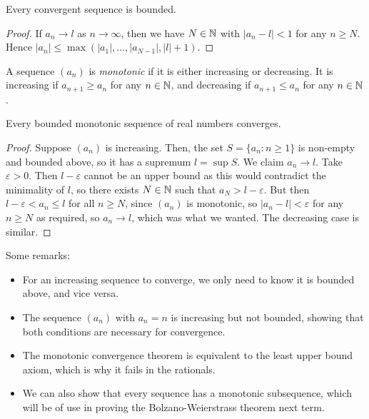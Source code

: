 \documentclass{../template/note}
\begin{document}
    \begin{proposition}
        Every convergent sequence is bounded.
    \end{proposition}
    
    \begin{proof}
        If \(a_n \to l\) as \(n \to \infty\), then we have \(N \in \mathbb N\) with \(|a_n-l| < 1\) for any \(n \geq N\). Hence \(|a_n| \leq \max(|a_1|, \dots, |a_{N-1}|, |l| + 1)\).
    \end{proof}
    
    \begin{definition}
        A sequence \((a_n)\) is \emph{monotonic} if it is either increasing or decreasing. It is increasing if \(a_{n+1} \geq a_n\) for any \(n \in \mathbb N\), and decreasing if \(a_{n+1} \leq a_n\) for any \(n \in \mathbb N\).
    \end{definition}
    
    \begin{theorem}
        Every bounded monotonic sequence of real numbers converges.
        \label{monotonic-convergence}
    \end{theorem}
    
    \begin{proof}
        Suppose \((a_n)\) is increasing. Then, the set \(S = \{a_n: n \geq 1\}\) is non-empty and bounded above, so it has a supremum \(l = \sup S\). We claim \(a_n \to l\). Take \(\varepsilon > 0\). Then \(l - \varepsilon\) cannot be an upper bound as this would contradict the minimality of \(l\), so there exists \(N \in \mathbb N\) such that \(a_N > l - \varepsilon\). But then \(l-\varepsilon < a_n \leq l\) for all \(n \geq N\), since \((a_n)\) is monotonic, so \(|a_n-l| < \varepsilon\) for any \(n \geq N\) as required, so \(a_n \to l\), which was what we wanted. The decreasing case is similar.
    \end{proof}
    
    \begin{remark*}
        Some remarks:
        \begin{itemize}
            \item For an increasing sequence to converge, we only need to know it is bounded above, and vice versa.
            \item The sequence \((a_n)\) with \(a_n = n\) is increasing but not bounded, showing that both conditions are necessary for convergence.
            \item The monotonic convergence theorem is equivalent to the least upper bound axiom, which is why it fails in the rationals.
            \item We can also show that every sequence has a monotonic subsequence, which will be of use in proving the Bolzano-Weierstrass theorem next term.
        \end{itemize}
    \end{remark*}
    
\end{document}
